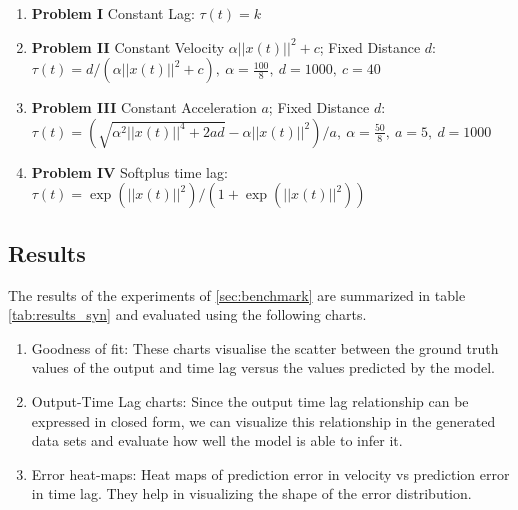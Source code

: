 \documentclass[envcountsect,runningheads]{llncs}
\theoremstyle{etoile}
\begin{document}
\begin{enumerate}
\item \textbf{Problem I} Constant Lag: \newline 
$\tau(t) = k$

\item \textbf{Problem II} Constant Velocity $\alpha ||x(t)||^2 + c$; Fixed Distance $d$: 
\newline $\tau(t) = d/(\alpha ||x(t)||^2 + c),\ \alpha = \frac{100}{8},\ d = 1000,\ c = 40$

\item \textbf{Problem III} Constant Acceleration $a$; Fixed Distance $d$: 
\newline $\tau(t) = (\sqrt{\alpha^2||x(t)||^4 + 2ad} - \alpha||x(t)||^2)/a,\ \alpha = \frac{50}{8},\ a = 5,\ d = 1000$

\item \textbf{Problem IV} Softplus time lag: 
\newline $\tau(t) = \exp\left(||x(t)||^2\right)/\left(1 + \exp(||x(t)||^2)\right)$

\end{enumerate}



\subsection{Results}

The results of the experiments of \ref{sec:benchmark} are summarized in table \ref{tab:results_syn} 
and evaluated using the following charts.

\begin{enumerate}
    \item Goodness of fit: These charts visualise the scatter between the ground truth values of the output
          and time lag versus the values predicted by the model. 
    \item Output-Time Lag charts: Since the output time lag relationship can be expressed in closed 
          form, we can visualize this relationship in the generated data sets and evaluate how well 
          the model is able to infer it.
    \item Error heat-maps: Heat maps of prediction error in velocity vs prediction error 
          in time lag. They help in visualizing the shape of the error distribution.
\end{enumerate}
\end{document}

